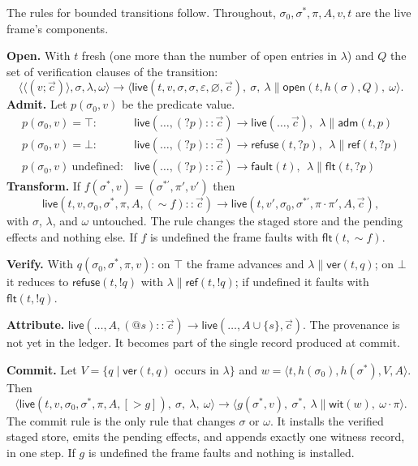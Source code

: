 \documentclass[11pt]{article}
\newcommand{\cfg}[1]{\langle #1\rangle}
\newcommand{\step}{\longrightarrow}
\newcommand{\live}{\mathsf{live}}
\newcommand{\refuseval}{\mathsf{refuse}}
\newcommand{\faultval}{\mathsf{fault}}
\newcommand{\hash}{h}
\newcommand{\app}{\mathbin{\|}}
\begin{document}
The rules for bounded transitions follow. Throughout, $\sigma_0,\sigma^{\ast},\pi,A,v,t$ are the live frame's components.

\medskip
\noindent\textbf{Open.} With $t$ fresh (one more than the number of \textsf{open} entries in $\lambda$) and $Q$ the set of verification clauses of the transition:
\[
\cfg{\langle\!(v;\vec c)\!\rangle,\sigma,\lambda,\omega}\step
\cfg{\live(t,v,\sigma,\sigma,\varepsilon,\varnothing,\vec c),\ \sigma,\ \lambda\app\mathsf{open}(t,\hash(\sigma),Q),\ \omega}.
\]
\noindent\textbf{Admit.} Let $p(\sigma_0,v)$ be the predicate value.
\[
\begin{array}{ll}
p(\sigma_0,v)=\top: & \live(\ldots,({?}p)\!::\!\vec c)\step\live(\ldots,\vec c),\ \ \lambda\app\mathsf{adm}(t,p)\\
p(\sigma_0,v)=\bot: & \live(\ldots,({?}p)\!::\!\vec c)\step\refuseval(t,{?}p),\ \ \lambda\app\mathsf{ref}(t,{?}p)\\
p(\sigma_0,v)\ \text{undefined}: & \live(\ldots,({?}p)\!::\!\vec c)\step\faultval(t),\ \ \lambda\app\mathsf{flt}(t,{?}p)
\end{array}
\]
\noindent\textbf{Transform.} If $f(\sigma^{\ast},v)=(\sigma^{\ast\prime},\pi',v')$ then
\[
\live(t,v,\sigma_0,\sigma^{\ast},\pi,A,({\sim}f)\!::\!\vec c)\step\live(t,v',\sigma_0,\sigma^{\ast\prime},\pi\cdot\pi',A,\vec c),
\]
with $\sigma$, $\lambda$, and $\omega$ untouched. The rule changes the staged store and the pending effects and nothing else. If $f$ is undefined the frame faults with $\mathsf{flt}(t,{\sim}f)$.

\noindent\textbf{Verify.} With $q(\sigma_0,\sigma^{\ast},\pi,v)$: on $\top$ the frame advances and $\lambda\app\mathsf{ver}(t,q)$; on $\bot$ it reduces to $\refuseval(t,{!}q)$ with $\lambda\app\mathsf{ref}(t,{!}q)$; if undefined it faults with $\mathsf{flt}(t,{!}q)$.

\noindent\textbf{Attribute.} $\live(\ldots,A,({@}s)\!::\!\vec c)\step\live(\ldots,A\cup\{s\},\vec c)$. The provenance is not yet in the ledger. It becomes part of the single record produced at commit.

\noindent\textbf{Commit.} Let $V=\{q\mid \mathsf{ver}(t,q)\text{ occurs in }\lambda\}$ and $w=\langle t,\hash(\sigma_0),\hash(\sigma^{\ast}),V,A\rangle$. Then
\[
\cfg{\live(t,v,\sigma_0,\sigma^{\ast},\pi,A,[{>}g]),\ \sigma,\ \lambda,\ \omega}\step
\cfg{g(\sigma^{\ast},v),\ \sigma^{\ast},\ \lambda\app\mathsf{wit}(w),\ \omega\cdot\pi}.
\]
The commit rule is the only rule that changes $\sigma$ or $\omega$. It installs the verified staged store, emits the pending effects, and appends exactly one witness record, in one step. If $g$ is undefined the frame faults and nothing is installed.
\end{document}
